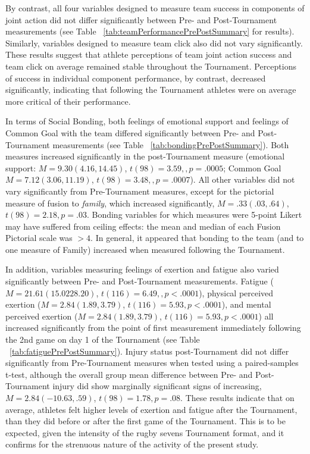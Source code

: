 \begin{CJK}{UTF8}{gbsn}
By contrast, all four variables designed to measure team success in components of joint action did not differ significantly between Pre- and Post-Tournament measurements (see Table ~\ref{tab:teamPerformancePrePostSummary} for results).  Similarly, variables designed to measure team click also did not vary significantly.  These results suggest that athlete perceptions of team joint action success and team click on average remained stable throughout the Tournament.  Perceptions of success in individual component performance, by contrast, decreased significantly, indicating that following the Tournament athletes were on average more critical of their performance.

In terms of Social Bonding, both feelings of emotional support and feelings of Common Goal with the team differed significantly between Pre- and Post-Tournament measurements (see Table ~\ref{tab:bondingPrePostSummary}). Both measures increased significantly in the post-Tournament measure (emotional support: $M = 9.30 (4.16, 14.45)$, $t(98)= 3.59,, p = .0005$; Common Goal $M = 7.12 (3.06, 11.19)$, $t(98)= 3.48,, p = .0007$).  All other variables did not vary significantly from Pre-Tournament measures, except for the pictorial measure of fusion to \textit{family}, which increased significantly, $M = .33(.03, .64)$, $t(98)= 2.18, p = .03$.  Bonding variables for which measures were 5-point Likert may have suffered from ceiling effects: the mean and median of each Fusion Pictorial scale was $> 4$.  In general, it appeared that bonding to the team (and to one measure of Family) increased when measured following the Tournament.

In addition, variables measuring feelings of exertion and fatigue also varied significantly between Pre- and Post-Tournament measurements.  Fatigue ($M = 21.61 (15.02 28.20)$, $t(116)= 6.49,, p < .0001$), physical perceived exertion ($M = 2.84 (1.89, 3.79)$, $t(116)= 5.93, p < .0001$), and mental perceived exertion ($M = 2.84 (1.89, 3.79)$, $t(116)= 5.93, p < .0001$) all increased significantly from the point of first measurement immediately following the 2nd game on day 1 of the Tournament (see Table ~\ref{tab:fatiguePrePostSummary}).  Injury status post-Tournament did not differ significantly from Pre-Tournament measures when tested using a paired-samples t-test, although the overall group mean difference between Pre- and Post-Tournament injury did show marginally significant signs of increasing, $M = 2.84 (-10.63, .59)$, $t(98)= 1.78, p = .08$.
These results indicate that on average, athletes felt higher levels of exertion and fatigue after the Tournament, than they did before or after the first game of the Tournament. This is to be expected, given the intensity of the rugby sevens Tournament format, and it confirms for the strenuous nature of the activity of the present study.






\end{CJK}
